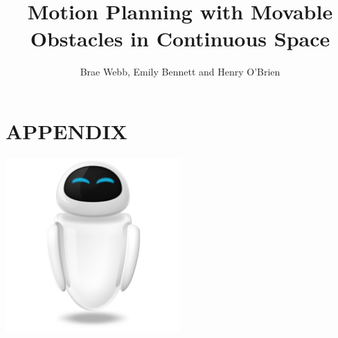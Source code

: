 \documentclass[a4paper, 10pt, journal, compsoc, onecolumn]{IEEEtran}
\title{\LARGE \bf
Motion Planning with Movable Obstacles in Continuous Space
}
\author{Brae Webb, Emily Bennett and Henry O'Brien}
\begin{document}
\maketitle
\thispagestyle{empty}
\pagestyle{empty}








\section*{APPENDIX}
\includegraphics[width=0.5\textwidth]{../logo.png}


\end{document}
